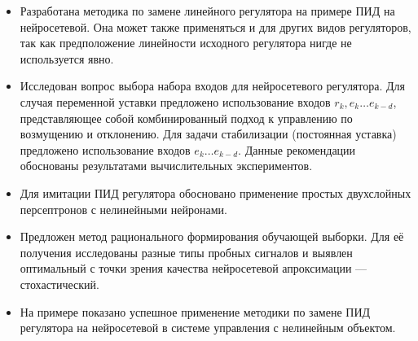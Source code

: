 \begin{itemize}

\item Разработана методика по замене линейного регулятора на примере
  ПИД на нейросетевой.  Она может также применяться и для других видов
  регуляторов, так как предположение линейности исходного регулятора
  нигде не используется явно.

\item Исследован вопрос выбора набора входов для нейросетевого
  регулятора.  Для случая переменной уставки предложено использование
  входов $r_k,e_k\ldots e_{k-d}$, представляющее собой комбинированный
  подход к управлению по возмущению и отклонению.  Для задачи
  стабилизации (постоянная уставка) предложено использование входов
  $e_k\ldots e_{k-d}$.  Данные рекомендации обоснованы результатами
  вычислительных экспериментов.

\item Для имитации ПИД регулятора обосновано применение простых
  двухслойных персептронов с нелинейными нейронами.

\item Предложен метод рационального формирования обучающей выборки.
  Для её получения исследованы разные типы пробных сигналов и выявлен
  оптимальный с точки зрения качества нейросетевой апроксимации ---
  стохастический.

\item На примере показано успешное применение методики по замене ПИД
  регулятора на нейросетевой в системе управления с нелинейным
  объектом.



\end{itemize}
